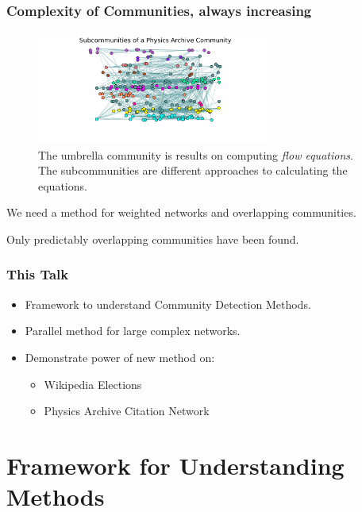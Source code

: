 \documentclass{beamer}
\begin{document}
\begin{frame}\frametitle{Complexity of Communities, always increasing}
\begin{figure}
\includegraphics[width=3in]{Figures/complex}
\caption{The umbrella community is results on computing {\it flow equations}.  The subcommunities are different approaches to calculating the equations.}
\end{figure}
\begin{block}{}
\begin{center}
We need a method for weighted networks and overlapping communities.
\end{center}
\end{block}
Only predictably overlapping communities have been found.
\end{frame}


\begin{frame}\frametitle{This Talk}
\begin{center}
\begin{itemize}
\item Framework to understand Community Detection Methods. \newline
\item Parallel method for large complex networks. \newline
\item Demonstrate power of new method on: \newline
	\begin{itemize}
		\item Wikipedia Elections \newline
		\item Physics Archive Citation Network
	\end{itemize}
\end{itemize}
\end{center}

\end{frame}


\section{Framework for Understanding Methods}
\end{document}
